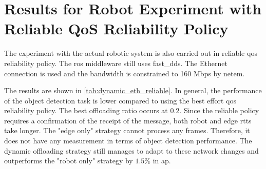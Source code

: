 \chapter{Results for Robot Experiment with Reliable QoS Reliability Policy}\label{ch:appendix_a}

The experiment with the actual robotic system is also carried out in reliable \gls{qos} reliability policy. The \gls{ros} middleware still uses \gls{fast_dds}. The Ethernet connection is used and the bandwidth is constrained to 160 Mbps by \gls{netem}. 

The results are shown in \cref{tab:dynamic_eth_reliable}. In general, the performance of the object detection task is lower compared to using the best effort \gls{qos} reliability policy. The best offloading ratio occurs at 0.2. Since the reliable policy requires a confirmation of the receipt of the message, both robot and edge \glspl{rtt} take longer. The "edge only" strategy cannot process any frames. Therefore, it does not have any measurement in terms of object detection performance. The dynamic offloading strategy still manages to adapt to these network changes and outperforms the "robot only" strategy by $1.5\%$ in \gls{ap}. 


